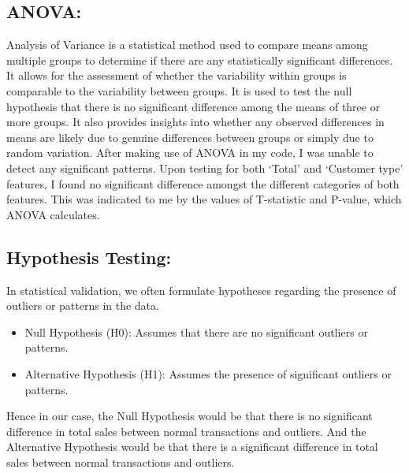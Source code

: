 \subsection{ANOVA:}
Analysis of Variance is a statistical method used to compare means among multiple groups to determine if there are any statistically significant differences. It allows for the assessment of whether the variability within groups is comparable to the variability between groups. It is used to test the null hypothesis that there is no significant difference among the means of three or more groups. It also provides insights into whether any observed differences in means are likely due to genuine differences between groups or simply due to random variation.
\newline 
After making use of ANOVA in my code, I was unable to detect any significant patterns. Upon testing for both ‘Total’ and ‘Customer type’ features, I found no significant difference amongst the different categories of both features. This was indicated to me by the values of T-statistic and P-value, which ANOVA calculates. 

\subsection{Hypothesis Testing:}
In statistical validation, we often formulate hypotheses regarding the presence of outliers or patterns in the data.
\begin{itemize}
    \item Null Hypothesis (H0): Assumes that there are no significant outliers or patterns.
    \item Alternative Hypothesis (H1): Assumes the presence of significant outliers or patterns.
\end{itemize}
Hence in our case, the Null Hypothesis would be that there is no significant difference in total sales between normal transactions and outliers. And the Alternative Hypothesis would be that there is a significant difference in total sales between normal transactions and outliers.

